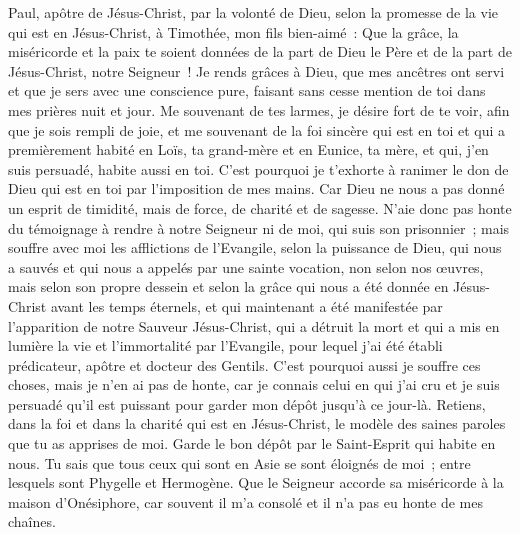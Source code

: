\begin{multicols}{2}
\VerseOne{}Paul, apôtre de Jésus-Christ, par la volonté de Dieu, selon la promesse de la vie qui est en Jésus-Christ,
à Timothée, mon fils bien-aimé~: Que la grâce, la miséricorde et la paix te soient données de la part de Dieu le Père et de la part de Jésus-Christ, notre Seigneur~!
Je rends grâces à Dieu, que mes ancêtres ont servi et que je sers avec une conscience pure, faisant sans cesse mention de toi dans mes prières nuit et jour.
Me souvenant de tes larmes, je désire fort de te voir, afin que je sois rempli de joie,
et me souvenant de la foi sincère qui est en toi et qui a premièrement habité en Loïs, ta grand-mère et en Eunice, ta mère, et qui, j'en suis persuadé, habite aussi en toi.
C'est pourquoi je t'exhorte à ranimer le don de Dieu qui est en toi par l'imposition de mes mains.
Car Dieu ne nous a pas donné un esprit de timidité, mais de force, de charité et de sagesse.
N'aie donc pas honte du témoignage à rendre à notre Seigneur ni de moi, qui suis son prisonnier~; mais souffre avec moi les afflictions de l'Evangile, selon la puissance de Dieu,
qui nous a sauvés et qui nous a appelés par une sainte vocation, non selon nos œuvres, mais selon son propre dessein et selon la grâce qui nous a été donnée en Jésus-Christ avant les temps éternels,
et qui maintenant a été manifestée par l'apparition de notre Sauveur Jésus-Christ, qui a détruit la mort et qui a mis en lumière la vie et l'immortalité par l'Evangile,
pour lequel j'ai été établi prédicateur, apôtre et docteur des Gentils.
C'est pourquoi aussi je souffre ces choses, mais je n'en ai pas de honte, car je connais celui en qui j'ai cru et je suis persuadé qu'il est puissant pour garder mon dépôt jusqu'à ce jour-là.
Retiens, dans la foi et dans la charité qui est en Jésus-Christ, le modèle des saines paroles que tu as apprises de moi.
Garde le bon dépôt par le Saint-Esprit qui habite en nous.
Tu sais que tous ceux qui sont en Asie se sont éloignés de moi~; entre lesquels sont Phygelle et Hermogène.
Que le Seigneur accorde sa miséricorde à la maison d'Onésiphore, car souvent il m'a consolé et il n'a pas eu honte de mes chaînes.

\end{multicols}
